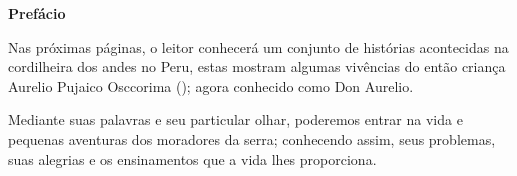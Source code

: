 \cleardoublepage
\newpage
\thispagestyle{empty}

\vfill
\begin{center}
\textbf{\LARGE  Prefácio }
\end{center}
Nas próximas páginas, o leitor conhecerá um conjunto de histórias acontecidas na cordilheira dos andes no Peru, estas mostram algumas vivências do então criança Aurelio Pujaico Osccorima (\Aulicha);
agora conhecido como Don Aurelio.

Mediante suas palavras e seu particular olhar, poderemos entrar na vida e pequenas aventuras dos moradores da serra; conhecendo assim, seus problemas, suas alegrias e os ensinamentos que a vida lhes proporciona. 
\vfill

\newpage
\thispagestyle{empty}
